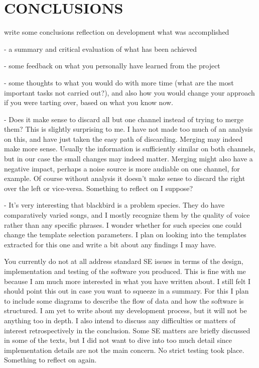 \chapter{CONCLUSIONS}

write some conclusions
reflection on development 
what was accomplished

- a summary and critical evaluation of what has been achieved

- some feedback on what you personally have learned from the project

- some thoughts to what you would do with more time (what are the
  most important tasks not carried out?), and also how you would
  change your approach if you were tarting over, based on what you
  know now.


  - Does it make sense to discard all but one channel instead of trying
  to merge them? This is slightly surprising to me.
I have not made too much of an analysis on this, and have just taken
the easy path of discarding. Merging may indeed make more sense.
Usually the information is sufficiently similar on both channels, but
in our case the small changes may indeed matter. Merging might
also have a negative impact, perhaps a noise source is more audiable
on one channel, for example. Of course without analysis it doesn't make
sense to discard the right over the left or vice-versa.
Something to reflect on I suppose?

- It's very interesting that blackbird is a problem species. They do
  have comparatively varied songs, and I mostly recognize them by the
  quality of voice rather than any specific phrases. I wonder whether
  for such species one could change the template selection
  parameters.
I plan on looking into the templates extracted for this one and write a 
bit about any findings I may have.

You currently do not at all address standard SE issues in terms of the
design, implementation and testing of the software you produced. This
is fine with me because I am much more interested in what you have
written about. I still felt I should point this out in case you want
to squeeze in a summary.
For this I plan to include some diagrams to describe the flow of data and
how the software is structured.
I am yet to write about my development process, but it will not be
anything too in depth.
I also intend to discuss any difficulties or matters of interest
retrospectively in the conclusion.
Some SE matters are briefly discussed in some of the texts, but I did not
want to dive into too much detail since implementation details are not the
main concern.
No strict testing took place. Something to reflect on again.
